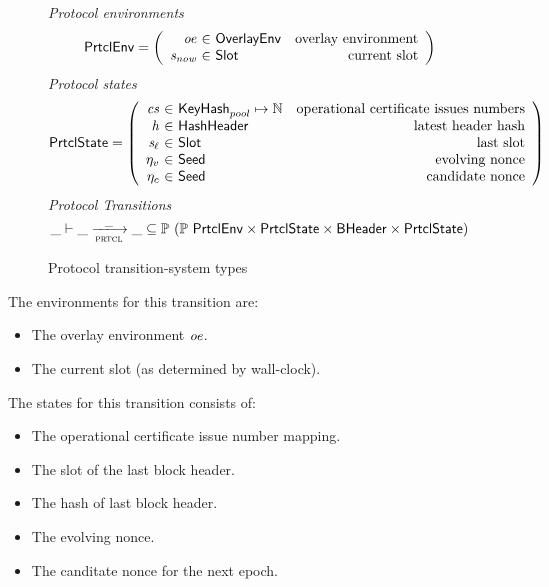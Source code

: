 \begin{figure}
  \emph{Protocol environments}
  \begin{equation*}
    \PrtclEnv =
    \left(
      \begin{array}{r@{~\in~}lr}
        \var{oe} & \OverlayEnv & \text{overlay environment} \\
        \var{s_{now}} & \Slot & \text{current slot} \\
      \end{array}
    \right)
  \end{equation*}
  \emph{Protocol states}
  \begin{equation*}
    \PrtclState =
    \left(
      \begin{array}{r@{~\in~}lr}
        \var{cs} & \KeyHash_{pool} \mapsto \N & \text{operational certificate issues numbers} \\
        \var{h} & \HashHeader & \text{latest header hash} \\
        \var{s_\ell} & \Slot & \text{last slot} \\
        \eta_v & \Seed & \text{evolving nonce} \\
        \eta_c & \Seed & \text{candidate nonce} \\
      \end{array}
    \right)
  \end{equation*}
  \emph{Protocol Transitions}
  \begin{equation*}
    \_ \vdash \var{\_} \trans{prtcl}{\_} \var{\_} \subseteq
    \powerset (\powerset{\PrtclEnv} \times \PrtclState \times \BHeader \times \PrtclState)
  \end{equation*}
  \caption{Protocol transition-system types}
  \label{fig:ts-types:prtcl}
\end{figure}

The environments for this transition are:
\begin{itemize}
  \item The overlay environment $\mathit{oe}$.
  \item The current slot (as determined by wall-clock).
\end{itemize}

The states for this transition consists of:
\begin{itemize}
  \item The operational certificate issue number mapping.
  \item The slot of the last block header.
  \item The hash of last block header.
  \item The evolving nonce.
  \item The canditate nonce for the next epoch.
\end{itemize}

